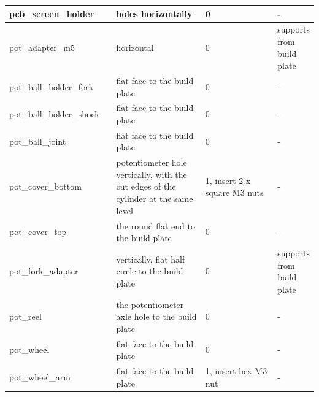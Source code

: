 \documentclass[a4paper,11pt]{article}
\begin{document}
\begin{longtable}{ |p{0.35\linewidth} | p{0.3\linewidth}| p{0.25\linewidth}| p{0.15\linewidth}|}
     \hline
     pcb\_screen\_holder &	holes horizontally &	0 &	-\\
     \hline
     pot\_adapter\_m5 &	horizontal &	0 &	supports from build plate\\
     \hline
     pot\_ball\_holder\_fork &	flat face to the build plate & 0 &	-\\
     \hline
     pot\_ball\_holder\_shock &	flat face to the build plate &	0 &	-\\
     \hline
     pot\_ball\_joint &	flat face to the build plate &	0 &	-\\
     \hline
     pot\_cover\_bottom &	potentiometer hole vertically, with the cut edges of the cylinder at the same level &	1, insert 2 x square M3 nuts &	-\\
     \hline
     pot\_cover\_top &	the round flat end to the build plate &	0 &	-\\
     \hline
     pot\_fork\_adapter &	vertically, flat half circle to the build plate &	0 &	supports from build plate\\
     \hline
     pot\_reel	& the potentiometer axle hole to the build plate &	0 &	-\\
     \hline
     pot\_wheel &	flat face to the build plate &	0 &	-\\
     \hline
      pot\_wheel\_arm &	flat face to the build plate &	1, insert hex M3 nut & -\\
     \hline
\end{longtable}
\end{document}
